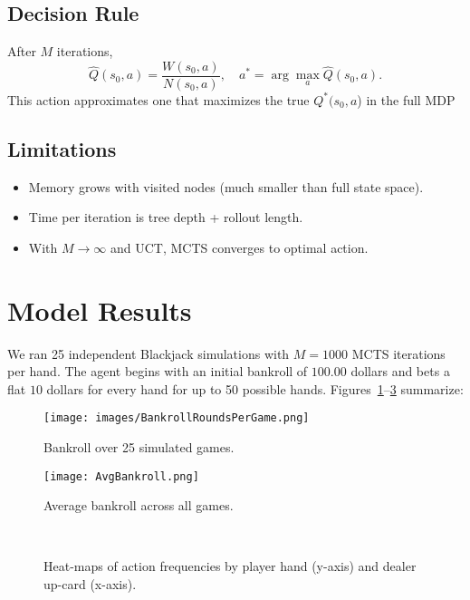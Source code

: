 \documentclass[12pt,a4paper]{cibb}
\begin{document}
\subsection{{Decision Rule}}
After \(M\) iterations,
\[
 \hat Q(s_0,a)=\frac{W(s_0,a)}{N(s_0,a)},\quad a^*=\arg\max_a \hat Q(s_0,a).
\]
This action approximates one that maximizes the true $Q^*(s_0,a$) in the full MDP

\subsection{{Limitations}}
\begin{itemize}[leftmargin=1.5cm]
  \item Memory grows with visited nodes (much smaller than full state space).  
  \item Time per iteration is tree depth + rollout length.  
  \item With \(M\to\infty\) and UCT, MCTS converges to optimal action.  
\end{itemize}

\section{Model Results}
We ran 25 independent Blackjack simulations with \(M=1000\) MCTS iterations per hand. The agent begins with an initial bankroll of $100.00$ dollars and bets a flat $10$ dollars for every hand for up to 50 possible hands. Figures~\ref{fig:bankroll}–\ref{fig:action_heatmaps} summarize:

\begin{figure}[H]
  \centering
  \texttt{[image: images/BankrollRoundsPerGame.png]}
  \caption{Bankroll over 25 simulated games.}
  \label{fig:bankroll}
\end{figure}

\begin{figure}[H]
  \centering
  \texttt{[image: AvgBankroll.png]}
  \caption{Average bankroll across all games.}
  \label{fig:avg_bankroll}
\end{figure}

\begin{figure}[H]
  \centering
  \\
  \caption{Heat-maps of action frequencies by player hand (y-axis) and dealer up-card (x-axis).}
  \label{fig:action_heatmaps}
\end{figure}
\end{document}
